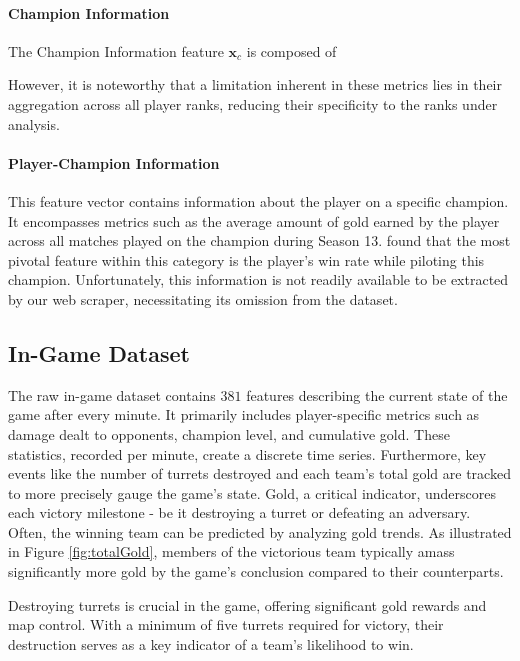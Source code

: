 \documentclass[12pt, a4paper, headinclude, twoside, plainheadsepline, open=right, numbers=noenddot, hidelinks, toc=listof, toc=bibliography]{scrreprt}
\begin{document}
\paragraph{Champion Information}
The Champion Information feature $\mathbf{x}_c$ is composed of 

However, it is noteworthy that a limitation inherent in these metrics lies in their aggregation across all player ranks, reducing their specificity to the ranks under analysis.
\paragraph{Player-Champion Information}
This feature vector contains information about the player on a specific champion.
It encompasses metrics such as the average amount of gold earned by the player across all matches played on the champion during Season 13. 
 \cite{costaFeatureAnalysisLeague2021} found that  the most pivotal feature within this category is the player's win rate while piloting this champion.
Unfortunately, this information is not readily available to be extracted by our web scraper,  necessitating its omission from the dataset.



\subsection{In-Game Dataset}
\label{ssec:in_game_data}

The raw in-game dataset contains $381$ features describing the current state of the game after every minute.
It primarily includes player-specific metrics such as damage dealt to opponents, champion level, and cumulative gold. These statistics, recorded per minute, create a discrete time series. Furthermore, key events like the number of turrets destroyed and each team's total gold are tracked to more precisely gauge the game's state. Gold, a critical indicator, underscores each victory milestone - be it destroying a turret or defeating an adversary. Often, the winning team can be predicted by analyzing gold trends. As illustrated in Figure \ref{fig:totalGold}, members of the victorious team typically amass significantly more gold by the game's conclusion compared to their counterparts.

Destroying turrets is crucial in the game, offering significant gold rewards and map control. 
With a minimum of five turrets required for victory, their destruction serves as a key indicator of a team's likelihood to win.
\end{document}

